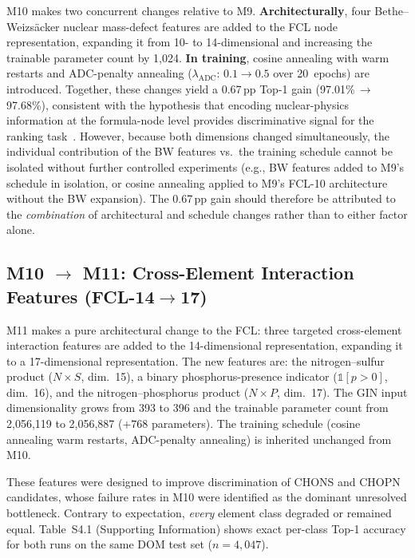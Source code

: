 \documentclass[journal=jcisd8]{achemso}
\begin{document}
M10 makes two concurrent changes relative to M9.
\textbf{Architecturally}, four Bethe--Weizs{\"a}cker nuclear mass-defect features are added to the FCL node
representation, expanding it from 10- to 14-dimensional and increasing the trainable
parameter count by 1,024.
\textbf{In training}, cosine annealing with warm restarts and
ADC-penalty annealing ($\lambda_\text{ADC}$: $0.1\to0.5$ over 20~epochs) are introduced.
Together, these changes yield a 0.67\,pp Top-1 gain (97.01\%\,$\to$\,97.68\%),
consistent with the hypothesis that encoding nuclear-physics information at the
formula-node level provides discriminative signal for the ranking
task~\cite{Roepstorff1984,Kind2007}.
However, because both dimensions changed simultaneously, the individual contribution of the
BW features vs.\ the training schedule cannot be isolated without further controlled
experiments (e.g., BW features added to M9's schedule in isolation, or cosine annealing
applied to M9's FCL-10 architecture without the BW expansion).
The 0.67\,pp gain should therefore be attributed to the \emph{combination}
of architectural and schedule changes rather than to either factor alone.

\subsection{M10 \texorpdfstring{$\to$}{→} M11: Cross-Element Interaction Features (FCL-14\texorpdfstring{$\to$}{→}17)}
\label{sec:run11_comparison}

M11 makes a pure architectural change to the FCL: three targeted cross-element
interaction features are added to the 14-dimensional representation, expanding it
to a 17-dimensional representation.
The new features are: the nitrogen--sulfur product
($N{\times}S$, dim.~15), a binary phosphorus-presence indicator
($\mathbb{1}[p{>}0]$, dim.~16), and the nitrogen--phosphorus product
($N{\times}P$, dim.~17).  The GIN input dimensionality grows from 393 to 396 and
the trainable parameter count from 2,056,119 to 2,056,887 ($+768$ parameters).
The training schedule (cosine annealing warm restarts, ADC-penalty annealing)
is inherited unchanged from M10.

These features were designed to improve discrimination of CHONS and CHOPN candidates,
whose failure rates in M10 were identified as the dominant unresolved bottleneck.
Contrary to expectation, \emph{every} element class degraded or remained equal.
Table~S4.1 (Supporting Information) shows exact per-class Top-1 accuracy for both runs
on the same DOM test set ($n=4{,}047$).
\end{document}
